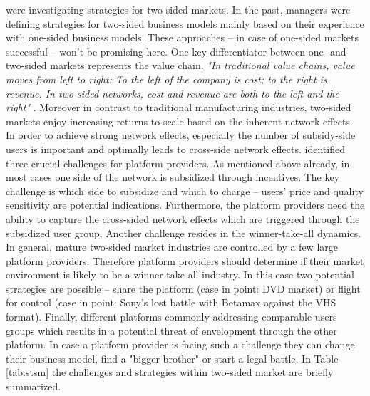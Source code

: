 \citet{Eisenmann2006} were investigating strategies for two-sided markets. In the past, managers were defining strategies for two-sided business models mainly based on their experience with one-sided business models. These approaches -- in case of one-sided markets successful -- won't be promising here. One key differentiator between one- and two-sided markets represents the value chain. \textit{"In traditional value chains, value moves from left to right: To the left of the company is cost; to the right is revenue. In two-sided networks, cost and revenue are both to the left and the right"} \citep[p. 94]{Eisenmann2006}. Moreover in contrast to traditional manufacturing industries, two-sided markets enjoy increasing returns to scale based on the inherent network effects. In order to achieve strong network effects, especially the number of subsidy-side users is important and optimally leads to cross-side network effects. \citet{Eisenmann2006} identified three crucial challenges for platform providers. As mentioned above already, in most cases one side of the network is subsidized through incentives. The key challenge is which side to subsidize and which to charge -- users' price and quality sensitivity are potential indications. Furthermore, the platform providers need the ability to capture the cross-sided network effects which are triggered through the subsidized user group. Another challenge resides in the winner-take-all dynamics. In general, mature two-sided market industries are controlled by a few large platform providers. Therefore platform providers should determine if their market environment is likely to be a winner-take-all industry. In this case two potential strategies are possible -- share the platform (case in point: \ac{DVD} market) or flight for control (case in point: Sony's lost battle with Betamax against the \ac{VHS} format). Finally, different platforms commonly addressing comparable users groups which results in a potential threat of envelopment through the other platform. In case a platform provider is facing such a challenge they can change their business model, find a "bigger brother" or start a legal battle. In Table \ref{tab:stsm} the challenges and strategies within two-sided market are briefly summarized.

